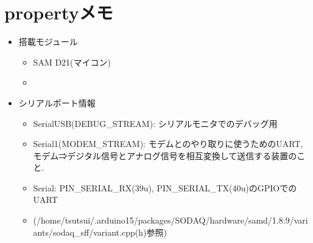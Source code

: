 \documentclass[11pt,a4paper,uplatex]{jsarticle}
\begin{document}
\section{propertyメモ}
\begin{itemize}
    \item 搭載モジュール
    \begin{itemize}
        \item SAM D21(マイコン)
        \item 
    \end{itemize}
    \item シリアルポート情報
    \begin{itemize}
        \item SerialUSB(DEBUG_STREAM): シリアルモニタでのデバッグ用
        \item Serial1(MODEM_STREAM): モデムとのやり取りに使うためのUART, モデム⇒デジタル信号とアナログ信号を相互変換して送信する装置のこと.
        \item Serial: PIN_SERIAL_RX(39u), PIN_SERIAL_TX(40u)のGPIOでのUART
        \item (/home/tsutsui/.arduino15/packages/SODAQ/hardware/samd/1.8.9/variants/sodaq_sff/variant.cpp(h)参照)
    \end{itemize}


\end{itemize}
\end{document}
